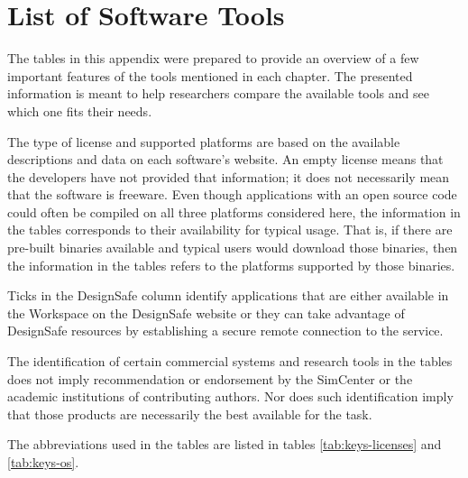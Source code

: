 
\chapter{List of Software Tools}

The tables in this appendix were prepared to provide an overview of a few important features of the tools mentioned in each chapter. The presented information is meant to help researchers compare the available tools and see which one fits their needs. 


The type of license and supported platforms are based on the available descriptions and data on each software's website. An empty license means that the developers have not provided that information; it does not necessarily mean that the software is freeware. Even though applications with an open source code could often be compiled on all three platforms considered here, the information in the tables corresponds to their availability for typical usage. That is, if there are pre-built binaries available and typical users would download those binaries, then the information in the tables refers to the platforms supported by those binaries.


Ticks in the DesignSafe column identify applications that are either available in the Workspace on the DesignSafe website or they can take advantage of DesignSafe resources by establishing a secure remote connection to the service. 


The identification of certain commercial systems and research tools in the tables does not imply recommendation or endorsement by the SimCenter or the academic institutions of contributing authors. Nor does such identification imply that those products are necessarily the best available for the task.


The abbreviations used in the tables are listed in tables \ref{tab:keys-licenses} and \ref{tab:keys-os}.




